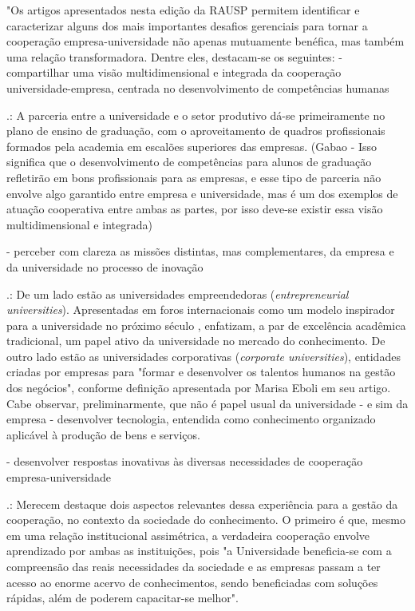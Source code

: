 "Os artigos apresentados nesta edição da RAUSP permitem identificar e caracterizar alguns dos mais importantes desafios gerenciais para tornar a cooperação empresa-universidade não apenas mutuamente benéfica, mas também uma relação transformadora. Dentre eles, destacam-se os seguintes: 
- compartilhar uma visão multidimensional e integrada da cooperação universidade-empresa, centrada no desenvolvimento de competências humanas

.: A parceria entre a universidade e o setor produtivo dá-se primeiramente no plano de ensino de graduação, com o aproveitamento de quadros profissionais formados pela academia em escalões superiores das empresas. (Gabao - Isso significa que o desenvolvimento de competências para alunos de graduação refletirão em bons profissionais para as empresas, e esse tipo de parceria não envolve algo garantido entre empresa e universidade, mas é um dos exemplos de atuação cooperativa entre ambas as partes, por isso deve-se existir essa visão multidimensional e integrada)

- perceber com clareza as missões distintas, mas complementares, da empresa e da universidade no processo de inovação

.: De um lado estão as universidades empreendedoras (\textit{entrepreneurial universities}). Apresentadas em foros internacionais como um modelo inspirador para a universidade no próximo século	, enfatizam, a par de excelência acadêmica tradicional, um papel ativo da universidade no mercado do conhecimento. De outro lado estão as universidades corporativas (\textit{corporate universities}), entidades criadas por empresas para "formar e desenvolver os talentos humanos na gestão dos negócios", conforme definição apresentada por Marisa Eboli em seu artigo.  Cabe observar, preliminarmente, que não é papel usual da universidade - e sim da empresa - desenvolver tecnologia, entendida como conhecimento organizado aplicável à produção de bens e serviços.

- desenvolver respostas inovativas às diversas necessidades de cooperação empresa-universidade

.: Merecem destaque dois aspectos relevantes dessa experiência para a gestão da cooperação, no contexto da sociedade do conhecimento. O primeiro é que, mesmo em uma relação institucional assimétrica, a verdadeira cooperação envolve aprendizado por ambas as instituições, pois "a Universidade beneficia-se com a compreensão das reais necessidades da sociedade e as empresas passam a ter acesso ao enorme acervo de conhecimentos, sendo beneficiadas com soluções rápidas, além de poderem capacitar-se melhor". 

